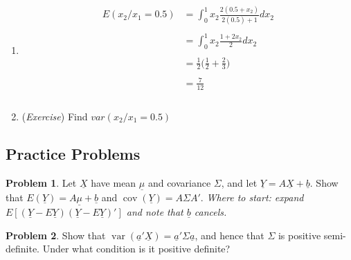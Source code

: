 \documentclass[11pt,a4paper]{article}
\theoremstyle{definition}
\newtheorem{problemx}{Problem}[section]
\newenvironment{problem}{\begin{problemx}}{\end{problemx}}
\begin{document}
\begin{enumerate}
\begin{enumerate}
\item
\begin{align*}
E(x_2/x_1=0.5) & = \int^1_0 x_2 \frac{2(0.5+x_2)}{2(0.5)+1}dx_2\\\\
               & = \int^1_0 x_2 \frac{1+ 2x_2}{2}dx_2\\\\
               & = \frac{1}{2}\Bigg(\frac{1}{2}+\frac{2}{3}\Bigg)\\\\
               & = \frac{7}{12}\\\\
\end{align*}


\item (\textit{Exercise}) Find $var(x_2/x_1=0.5)$\\
\end{enumerate}
\end{enumerate}



















\pagebreak

\subsection{Practice Problems}

\begin{problem}
Let $\underline{X}$ have mean $\underline{\mu}$ and covariance $\Sigma$, and let
$\underline{Y} = A\underline{X}+\underline{b}$. Show that
$E(\underline{Y}) = A\underline{\mu}+\underline{b}$ and
$\operatorname{cov}(\underline{Y}) = A\Sigma A'$.
\emph{Where to start: expand
$E\left[(\underline{Y}-E\underline{Y})(\underline{Y}-E\underline{Y})'\right]$
and note that $\underline{b}$ cancels.}
\end{problem}

\begin{problem}
Show that $\operatorname{var}\left(\underline{a}'\underline{X}\right)
= \underline{a}'\Sigma\underline{a}$, and hence that $\Sigma$ is positive
semi-definite. Under what condition is it positive definite?
\end{problem}
\end{document}

